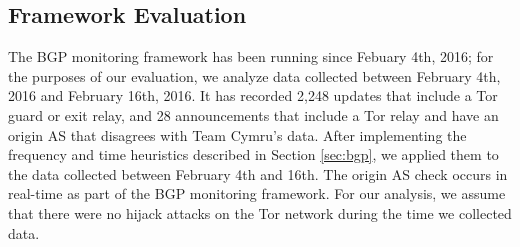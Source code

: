 


\subsection{Framework Evaluation}
The BGP monitoring framework has been running since Febuary 4th, 2016; for the purposes of our evaluation, we analyze data collected between February 4th, 2016 and February 16th, 2016.  It has recorded 2,248 updates that include a Tor guard or exit relay, and 28 announcements that include a Tor relay and have an origin AS that disagrees with Team Cymru's data.  After implementing the frequency and time heuristics described in Section \ref{sec:bgp}, we applied them to the data collected between February 4th and 16th.  The origin AS check occurs in real-time as part of the BGP monitoring framework.  For our analysis, we assume that there were no hijack attacks on the Tor network during the time we collected data.  

